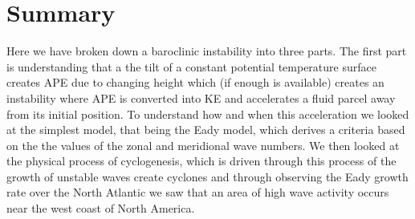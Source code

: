 \documentclass[a4paper,12pt]{article}
\begin{document}
\section{Summary}
Here we have broken down a baroclinic instability into three parts. The first part is understanding that a the tilt of a constant potential temperature surface creates APE due to changing height which (if enough is available) creates an instability where APE is converted into KE and accelerates a fluid parcel away from its initial position. To understand how and when this acceleration we looked at the simplest model, that being the Eady model, which derives a criteria based on the the values of the zonal and meridional wave numbers. We then looked at the physical process of cyclogenesis, which is driven through this process of the growth of unstable waves create cyclones and through observing the Eady growth rate over the North Atlantic we saw that an area of high wave activity occurs near the west coast of North America.
%
%
\newpage
\printbibliography
\end{document}
